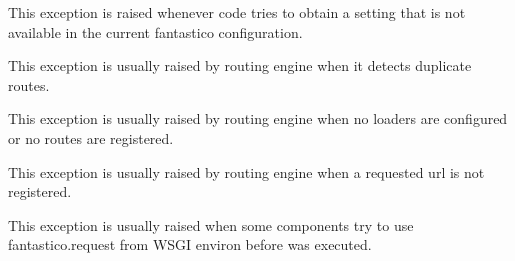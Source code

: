 \documentclass[letterpaper,10pt,english]{sphinxmanual}
\begin{document}
\begin{fulllineitems}
\label{features/exceptions:fantastico.exceptions.FantasticoSettingNotFoundError}
This exception is raised whenever code tries to obtain a setting that is not available in the current fantastico
configuration.

\end{fulllineitems}


\begin{fulllineitems}
\label{features/exceptions:fantastico.exceptions.FantasticoDuplicateRouteError}
This exception is usually raised by routing engine when it detects duplicate routes.

\end{fulllineitems}


\begin{fulllineitems}
\label{features/exceptions:fantastico.exceptions.FantasticoNoRoutesError}
This exception is usually raised by routing engine when no loaders are configured or no routes are registered.

\end{fulllineitems}


\begin{fulllineitems}
\label{features/exceptions:fantastico.exceptions.FantasticoRouteNotFoundError}
This exception is usually raised by routing engine when a requested url is not registered.

\end{fulllineitems}


\begin{fulllineitems}
\label{features/exceptions:fantastico.exceptions.FantasticoNoRequestError}
This exception is usually raised when some components try to use fantastico.request from WSGI environ before 
{\hyperref[features/request_response:fantastico.middleware.request_middleware.RequestMiddleware]{}} was executed.

\end{fulllineitems}
\end{document}
